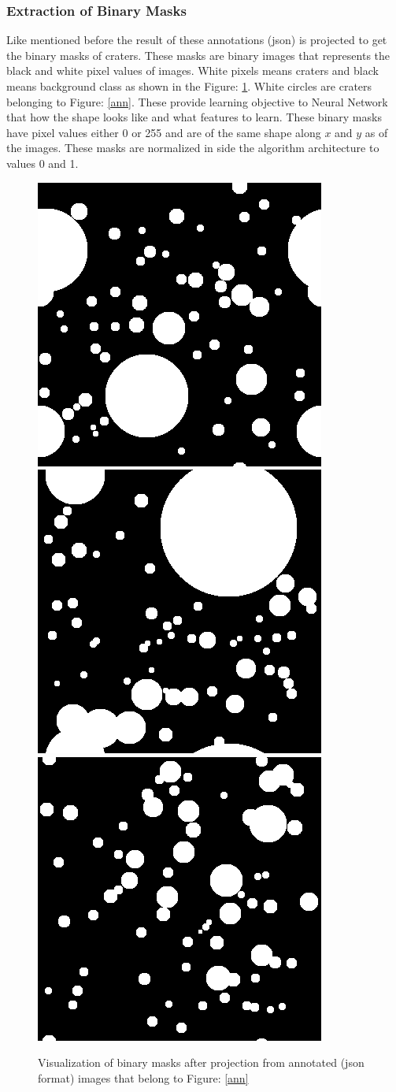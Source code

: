 \documentclass[11pt]{article}
\begin{document}
\subsubsection{Extraction of Binary Masks}
Like mentioned before the result of these annotations (json) is projected to get the binary masks of craters. These masks are binary images that represents the black and white pixel values of images. White pixels means craters and black means background class as shown in the Figure: \ref{mask}. White circles are craters belonging to Figure: \ref{ann}. These provide learning objective to Neural Network that how the shape looks like and what features to learn. These binary masks have pixel values either 0 or 255 and are of the same shape along $x$ and $y$ as of the images. These masks are normalized in side the algorithm architecture to values 0 and 1.

\begin{figure}[ht!]
	\includegraphics[width=.3\textwidth]{files/annotation/66m.png}\hfill
	\includegraphics[width=.3\textwidth]{files/annotation/29m.png}\hfill
	\includegraphics[width=.3\textwidth]{files/annotation/20m.png}
	\caption{Visualization of binary masks after projection from annotated (json format) images that belong to Figure: \ref{ann}}
	\label{mask}
\end{figure}
\end{document}
